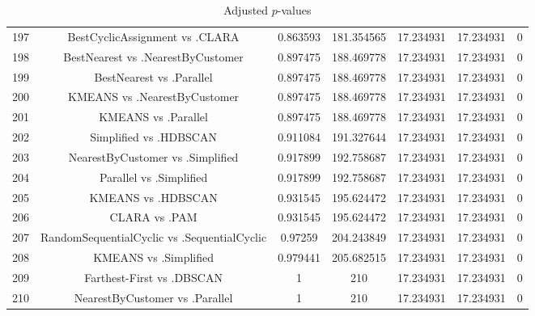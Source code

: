 \documentclass[a4paper,10pt]{article}
\begin{document}
\begin{landscape}
\begin{table}[!htp]
\begin{tabular}{ccccccc}
197&BestCyclicAssignment vs .CLARA&0.863593&181.354565&17.234931&17.234931&0\\
198&BestNearest vs .NearestByCustomer&0.897475&188.469778&17.234931&17.234931&0\\
199&BestNearest vs .Parallel&0.897475&188.469778&17.234931&17.234931&0\\
200&KMEANS vs .NearestByCustomer&0.897475&188.469778&17.234931&17.234931&0\\
201&KMEANS vs .Parallel&0.897475&188.469778&17.234931&17.234931&0\\
202&Simplified vs .HDBSCAN&0.911084&191.327644&17.234931&17.234931&0\\
203&NearestByCustomer vs .Simplified&0.917899&192.758687&17.234931&17.234931&0\\
204&Parallel vs .Simplified&0.917899&192.758687&17.234931&17.234931&0\\
205&KMEANS vs .HDBSCAN&0.931545&195.624472&17.234931&17.234931&0\\
206&CLARA vs .PAM&0.931545&195.624472&17.234931&17.234931&0\\
207&RandomSequentialCyclic vs .SequentialCyclic&0.97259&204.243849&17.234931&17.234931&0\\
208&KMEANS vs .Simplified&0.979441&205.682515&17.234931&17.234931&0\\
209&Farthest-First vs .DBSCAN&1&210&17.234931&17.234931&0\\
210&NearestByCustomer vs .Parallel&1&210&17.234931&17.234931&0\\
\hline
\end{tabular}
\caption{Adjusted $p$-values}
\end{table}

\end{landscape}
\end{document}
